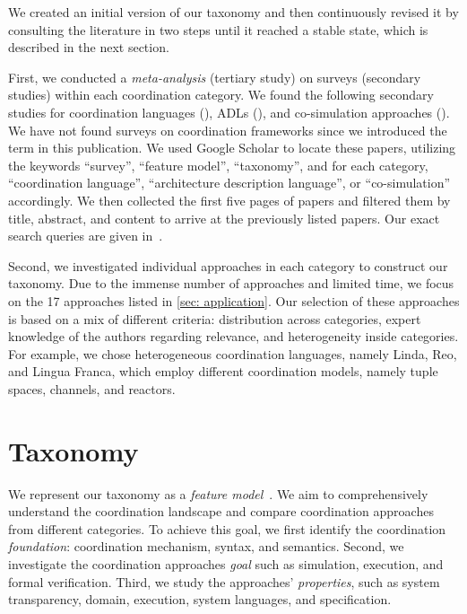 \documentclass[runningheads]{llncs}
\newcommand{\quotes}[1]{``#1''}
\begin{document}
We created an initial version of our taxonomy and then continuously revised it by consulting the literature in two steps until it reached a stable state, which is described in the next section.

First, we conducted a \textit{meta-analysis} (tertiary study) on surveys (secondary studies) within each coordination category.
We found the following  secondary studies for coordination languages (\cite{papadopoulosCoordinationModelsLanguages1998,goosCoordinationModelsLanguages2001,rossiTuplebasedTechnologiesCoordination2001}), ADLs (\cite{clementsSurveyArchitectureDescription1996,medvidovicClassificationComparisonFramework2000,hussainInvestigatingArchitectureDescription2013,ozkayaAreWeThere2013,malavoltaWhatIndustryNeeds2013}), and co-simulation approaches (\cite{gomesCoSimulationSurvey2019,schweigerEmpiricalSurveyCosimulation2019,hafnerOverviewStateArt2021}).
We have not found surveys on coordination frameworks since we introduced the term in this publication.
We used Google Scholar to locate these papers, utilizing the keywords \quotes{survey}, \quotes{feature model}, \quotes{taxonomy}, and for each category, \quotes{coordination language}, \quotes{architecture description language}, or \quotes{co-simulation} accordingly.
We then collected the first five pages of papers and filtered them by title, abstract, and content to arrive at the previously listed papers.
Our exact search queries are given in~\cite{timkrauterArtifactsCoordination2024}.

Second, we investigated individual approaches in each category to construct our taxonomy.
Due to the immense number of approaches and limited time, we focus on the 17 approaches listed in \autoref{sec: application}.
Our selection of these approaches is based on a mix of different criteria: distribution across categories, expert knowledge of the authors regarding relevance, and heterogeneity inside categories.
For example, we chose heterogeneous coordination languages, namely Linda, Reo, and Lingua Franca, which employ different coordination models, namely tuple spaces, channels, and reactors.

\section{Taxonomy} \label{sec: taxonomy}
We represent our taxonomy as a \textit{feature model}~\cite{kangFeatureOrientedDomainAnalysis1990}.
We aim to comprehensively understand the coordination landscape and compare coordination approaches from different categories.
To achieve this goal, we first identify the coordination \textit{foundation}: coordination mechanism, syntax, and semantics.
Second, we investigate the coordination approaches \textit{goal} such as simulation, execution, and formal verification.
Third, we study the approaches' \textit{properties}, such as system transparency, domain, execution, system languages, and specification.
\end{document}
